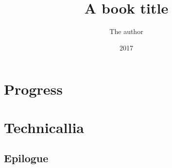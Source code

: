 \documentclass[letterpaper,12pt]{memoir}
\author{The author}
\title{A book title}
\date{2017}
\begin{document}
	\maketitle
	\frontmatter
		
		
	\mainmatter
		\part{Progress}
		
		\part{Technicallia}
		
	\appendix
		\appendixpage
		
	\backmatter
		\chapter{Epilogue}
		\lipsum[1-48]
		\cleardoublepage
		\tableofcontents
		\cleardoublepage
		\listoftables
		\listoffigures
		\cleardoublepage
		\printindex
\end{document}
